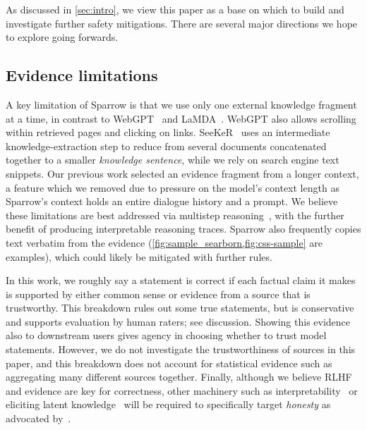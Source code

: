 As discussed in \ref{sec:intro}, we view this paper as a base on which to build and investigate further safety mitigations.  There are several major directions we hope to explore going forwards.

\subsection{Evidence limitations} \label{sec:limitations}

A key limitation of Sparrow is that we use only one external knowledge fragment at a time, in contrast to WebGPT~\citep{nakano2021webgpt} and LaMDA~\citep{thoppilan2022lamda}. WebGPT also allows scrolling within retrieved pages and clicking on links.  SeeKeR~\citep{shuster2022seeker,adolphs2021reason} uses an intermediate knowledge-extraction step to reduce from several documents concatenated together to a smaller \emph{knowledge sentence}, while we rely on search engine text snippets. Our previous work \citet{menick2022teaching} selected an evidence fragment from a longer context, a feature which we removed due to pressure on the model's context length as Sparrow's context holds an entire dialogue history and a prompt.  We believe these limitations are best addressed via multistep reasoning~\citep{lewkowycz2022solving,creswell2022selection,dohan2022language}, with the further benefit of producing interpretable reasoning traces. Sparrow also frequently copies text verbatim from the evidence (\ref{fig:sample_searborn,fig:css-sample} are examples), which could likely be mitigated with further rules.

In this work, we roughly say a statement is correct if each factual claim it makes is supported by either common sense or evidence from a source that is trustworthy. This breakdown rules out some true statements, but is conservative and supports evaluation by human raters; see \citet{evans2021truthful} discussion. Showing this evidence also to downstream users gives agency in choosing whether to trust model statements. However, we do not investigate the trustworthiness of sources in this paper, and this breakdown does not account for statistical evidence such as aggregating many different sources together. Finally, although we believe RLHF and evidence are key for correctness, other machinery such as interpretability~\citep{elhage2021mathematical} or eliciting latent knowledge~\citep{christiano2021elk} will be required to specifically target \emph{honesty} as advocated by~\citet{askell2021general}.

